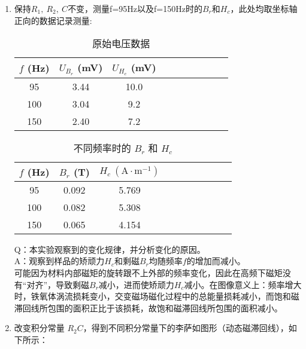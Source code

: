 \documentclass[11pt]{article}
\begin{document}
\begin{enumerate}
		
		\item 保持$R_1, \ R_2, \ C$不变，测量f=95Hz以及f=150Hz时的$B_r$和$H_c$，此处均取坐标轴正向的数据记录测量:
		\begin{center}
			\noindent\begin{minipage}{0.49\columnwidth}
				\begin{table}[H]\centering
					\caption{原始电压数据}
					\begin{tabular}{cccccccccc}\toprule
						$f$ (Hz) & $U_{B_r}$ (mV) & $U_{H_c} $ (mV)  \\
						\midrule
						95  &  3.44&   10.0\\
						100 & 3.04 &   9.2\\
						150 & 2.40 & 7.2 \\
						\bottomrule
					\end{tabular}
				\end{table}
			\end{minipage}\begin{minipage}{0.49\columnwidth}
				\begin{table}[H]\centering
					\caption{不同频率时的 $B_r$ 和 $H_c$}
					\begin{tabular}{cccccccccc}\toprule
						$f$ (Hz) & $B_r$ (T) & $H_c \ (\mathrm{A\cdot m^{-1}})$  \\
						\midrule
						95  &  0.092 & 5.769  \\
						100 & 0.082 & 5.308  \\
						150 & 0.065& 4.154  \\
						\bottomrule
					\end{tabular}
				\end{table}
			\end{minipage}
		\end{center}
		Q：本实验观察到的变化规律，并分析变化的原因。\\
		A：观察到样品的矫顽力$H_c$和剩磁$B_r$均随频率$f$的增加而减小。\\
		\indent \qquad 可能因为材料内部磁矩的旋转跟不上外部的频率变化，因此在高频下磁矩没有“对齐”，导致剩磁$B_r$减小，进而使矫顽力$H_c$减小。在图像意义上：频率增大时，铁氧体涡流损耗变小，交变磁场磁化过程中的总能量损耗减小，而饱和磁滞回线所包围的面积正比于该损耗，故饱和磁滞回线所包围的面积减小。
		
		\item 改变积分常量 $R_2 C$，得到不同积分常量下的李萨如图形（动态磁滞回线），如下所示：
		

\end{enumerate}
\end{document}
